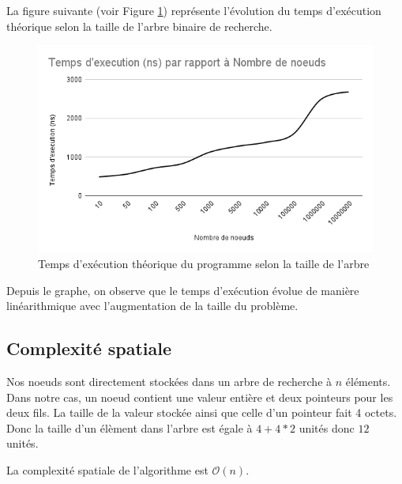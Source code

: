 La figure suivante (voir Figure \ref{fig:temps_exec_abr_theo}) représente l'évolution du temps d'exécution théorique selon la taille de l'arbre binaire de recherche.

\begin{figure}[H]
    \centering
        \includegraphics[scale=0.7]{./ressources/exe theo.png}
        \caption{Temps d'exécution théorique du programme selon la taille de l'arbre}
    \label{fig:temps_exec_abr_theo}
\end{figure} 

Depuis le graphe,  on observe que le temps d'exécution évolue de manière linéarithmique avec l'augmentation de la taille du problème.

\subsection{Complexité spatiale}

\par
Nos noeuds sont directement stockées dans un arbre de recherche à $n$ éléments. Dans notre cas, un noeud contient une valeur entière et deux pointeurs pour les deux fils. La taille de la valeur stockée ainsi que celle d'un pointeur fait 4 octets. Donc la taille d'un élèment dans l'arbre est égale à $4+ 4*2$ unités donc $12$ unités.
\par
La complexité spatiale de l’algorithme est $\mathcal{O}(n)$.
\par

